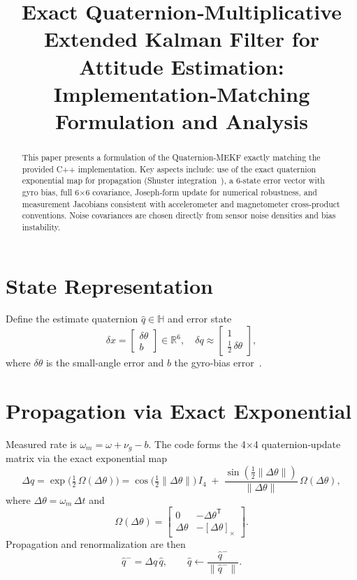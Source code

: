 \documentclass[12pt,letterpaper]{article}
\title{Exact Quaternion‐Multiplicative Extended Kalman Filter for Attitude Estimation:\\
Implementation‐Matching Formulation and Analysis}
\author{}
\date{}
\begin{document}
\maketitle

\begin{abstract}
This paper presents a formulation of the Quaternion‐MEKF exactly matching the provided C++ implementation.  Key aspects include: use of the exact quaternion exponential map for propagation (Shuster integration~\cite{Shuster1981}), a 6‐state error vector with gyro bias, full 6×6 covariance, Joseph‐form update for numerical robustness, and measurement Jacobians consistent with accelerometer and magnetometer cross‐product conventions.  Noise covariances are chosen directly from sensor noise densities and bias instability.
\end{abstract}

\section{State Representation}
Define the estimate quaternion $\hat q\in\mathbb H$ and error state
\[
\delta x = \begin{bmatrix}\delta\theta\\ b\end{bmatrix}\in\mathbb R^6,
\quad
\delta q \approx \begin{bmatrix}1\\ \tfrac12\,\delta\theta\end{bmatrix},
\]
where $\delta\theta$ is the small‐angle error and $b$ the gyro‐bias error~\cite{Lefferts1982,Markley2003}.

\section{Propagation via Exact Exponential}
Measured rate is $\omega_m=\omega+\nu_g - b$.  The code forms the 4×4 quaternion‐update matrix via the exact exponential map
\[
\Delta q
=\exp\!\bigl(\tfrac12\,\Omega(\Delta\theta)\bigr)
=\cos\!\bigl(\tfrac12\|\Delta\theta\|\bigr)\,I_4
\;+\;\frac{\sin(\tfrac12\|\Delta\theta\|)}{\|\Delta\theta\|}\,\Omega(\Delta\theta),
\]
where $\Delta\theta=\omega_m\,\Delta t$ and
\[
\Omega(\Delta\theta)
=\begin{bmatrix}
0 & -\Delta\theta^\mathsf{T}\\[3pt]
\Delta\theta & -[\Delta\theta]_\times
\end{bmatrix}.
\]
Propagation and renormalization are then
\[
\hat q^-=\Delta q\,\hat q,
\qquad
\hat q\leftarrow\frac{\hat q^-}{\|\hat q^-\|}.
\]
\end{document}
